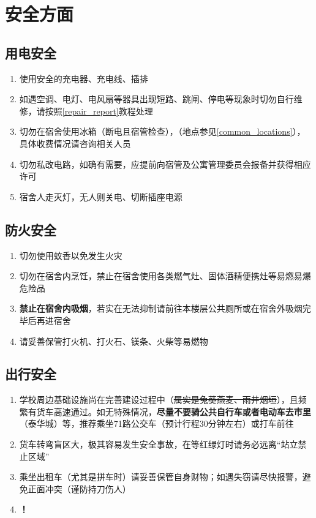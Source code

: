 \chapter[安全方面]{安全方面}

\section[用电安全]{用电安全}
\begin{enumerate}
    \item 使用安全的充电器、充电线、插排
    \item 如遇空调、电灯、电风扇等器具出现短路、跳闸、停电等现象时切勿自行维修，请按照\uline{\ref{repair_report}}教程处理
    \item 切勿在宿舍使用冰箱（断电且宿管检查），\textbf{}（地点参见\uline{\ref{common_locations}}），具体收费情况请咨询相关人员
    \item 切勿私改电路，如确有需要，应提前向宿管及公寓管理委员会\footnotemark 报备并获得相应许可
    \item 宿舍人走灭灯，无人则关电、切断插座电源
\end{enumerate}

\section[防火安全]{防火安全}
\begin{enumerate}
    \item 切勿使用蚊香以免发生火灾
    \item 切勿在宿舍内烹饪，禁止在宿舍使用各类燃气灶、固体酒精便携灶等易燃易爆危险品
    \item \textbf{禁止在宿舍内吸烟}，若实在无法抑制请前往本楼层公共厕所或在宿舍外吸烟完毕后再进宿舍
    \item 请妥善保管打火机、打火石、镁条、火柴等易燃物
\end{enumerate}

\section[出行安全]{出行安全}
\begin{enumerate}
    \item 学校周边基础设施尚在完善建设过程中（\sout{属实是兔葵燕麦、雨井烟垣}），且频繁有货车高速通过。如无特殊情况，\textbf{尽量不要骑公共自行车或者电动车去市里}（泰华城）等，推荐乘坐71路公交车（预计行程30分钟左右）或打车前往
    \item 货车转弯盲区大，极其容易发生安全事故，在等红绿灯时请务必远离“站立禁止区域”
    \item 乘坐出租车（尤其是拼车时）请妥善保管自身财物；如遇失窃请尽快报警，避免正面冲突（谨防持刀伤人）
    \item \textbf{！}
\end{enumerate}

